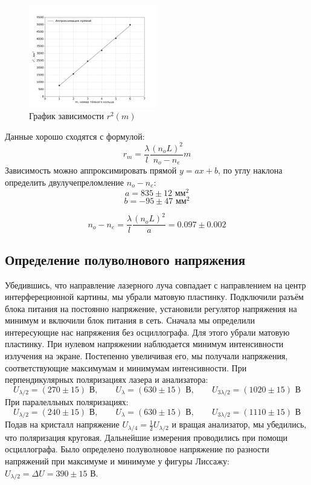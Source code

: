 \begin{figure}[H]
	\centering
	\includegraphics[width=0.5\textwidth]{Графики/r2(m).png}
	\caption{График зависимости $r^2(m)$}
\end{figure}
\n
Данные хорошо сходятся с формулой:
\[r_m = \frac{\lambda}{l} \frac{(n_o L)^2}{n_o - n_e} m\]
\n
Зависимость можно аппроксимировать прямой $y = a x + b$, по углу наклона определить двулучепреломление $n_o - n_e$: \\
\[a = 835 \pm 12 \text{ мм}^2\]
\[b = -95 \pm 47 \text{ мм}^2\]

$$n_o - n_e = \frac{\lambda}{l}\frac{(n_o L)^2}{a} = 0.097 \pm 0.002$$

\subsection*{Определение полуволнового напряжения}
Убедившись, что направление лазерного луча совпадает с направлением на центр интерфереционной картины, мы убрали матовую пластинку. Подключили разъём блока питания на постоянно напряжение, установили регулятор напряжения на минимум и включили блок питания в сеть.
\n\n
Сначала мы определили интересующие нас напряжения без осциллографа. Для этого убрали матовую пластинку. При нулевом напряжении наблюдается минимум интенсивности излучения на экране. Постепенно увеличивая его, мы получали напряжения, соответствующие максимумам и минимумам интенсивности.
\n\n
При перпендикулярных поляризациях лазера и анализатора:
\[U_{\lambda/2} = (270 \pm 15) \text{ В}, \qquad U_\lambda = (630 \pm 15) \text{ В}, \qquad U_{3\lambda/2} = (1020 \pm 15) \text{ В}\]
При паралелльных поляризациях:
\[U_{\lambda/2} = (240 \pm 15) \text{ В}, \qquad U_\lambda = (630 \pm 15) \text{ В}, \qquad U_{3\lambda/2} = (1110 \pm 15) \text{ В}\]
\n
Подав на кристалл напряжение $U_{\lambda/4} = \frac{1}{2}U_{\lambda/2}$ и вращая анализатор, мы убедились, что поляризация круговая.
\n\n
Дальнейшие измерения проводились при помощи осциллографа. Было определено полуволновое напряжение по разности напряжений при максимуме и минимуме у фигуры Лиссажу: $U_{\lambda/2} = \Delta U = 390 \pm 15 \text{ В}$. 
	
